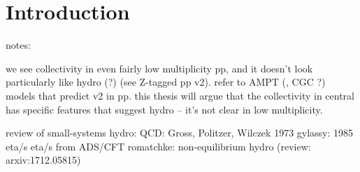 \chapter{Introduction}
\label{ch:intro}


 notes:

 we see collectivity in even fairly low multiplicity pp, and it doesn't look particularly like hydro (?) (see Z-tagged pp v2). refer to AMPT (, CGC ?) models that predict v2 in pp. this thesis will argue that the collectivity in central \pPb has specific features that suggest hydro -- it's not clear in low multiplicity.

 review of small-systems hydro: \cite{Nagle:2018nvi}
 QCD: Gross, Politzer, Wilczek 1973 \cite{Gross:1973ju} 
 gylassy: 1985 eta/s \cite{Danielewicz:1984ww}
 eta/s from ADS/CFT \cite{Kovtun:2004de}
 romatchke: non-equilibrium hydro \cite{Romatschke:2016hle,Romatschke:2017vte} (review: arxiv:1712.05815)
